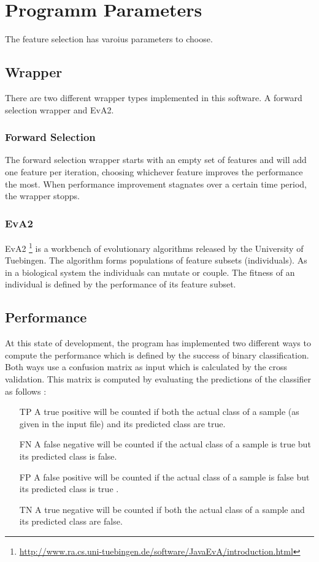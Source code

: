 \documentclass[headsepline,12pt,a4paper]{scrartcl}
\begin{document}
\section{Programm Parameters}

The feature selection has varoius parameters to choose.
\subsection{Wrapper}
There are two different wrapper types implemented in this software. A
forward selection wrapper and EvA2. 

\subsubsection{Forward Selection}
The forward selection wrapper starts with an empty set of features and
will add one feature per iteration, choosing whichever feature improves the performance the most. When performance improvement stagnates over a certain
time period, the wrapper stopps.
\subsubsection{EvA2}
EvA2
\footnote[1]{\url{http://www.ra.cs.uni-tuebingen.de/software/JavaEvA/introduction.html}}
is a workbench of evolutionary algorithms released by the University of
Tuebingen. The algorithm forms populations of feature subsets
(individuals). As in a biological system the individuals can mutate or couple. The fitness of an individual is defined by the performance of its feature subset.



\subsection{Performance}
At this state of development, the program has implemented two different ways to compute the performance which is defined by the success of binary classification. Both ways use a confusion matrix  as input which is calculated by the cross validation. This matrix is computed by evaluating the predictions of the classifier as follows : \\
\begin{enumerate}
\item [TP] A true positive will be counted if both the actual class of a sample (as given in the input file) and its predicted class are true.
\item [FN] A false negative will be counted if the actual class of a sample is true but its predicted class is false.
\item [FP] A false positive will be counted if the actual class of a sample is false but its predicted class is true .
\item [TN] A true negative will be counted if both the actual class of a sample and its predicted class are false.
\end{enumerate}
\end{document}
